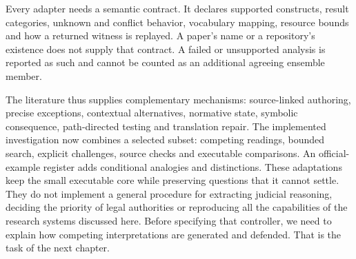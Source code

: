 
Every adapter needs a semantic contract. It declares supported constructs,
result categories, unknown and conflict behavior, vocabulary mapping,
resource bounds and how a returned witness is replayed. A paper's name or
a repository's existence does not supply that contract. A failed or
unsupported analysis is reported as such and cannot be counted as an
additional agreeing ensemble member.

The literature thus supplies complementary mechanisms: source-linked
authoring, precise exceptions, contextual alternatives, normative state,
symbolic consequence, path-directed testing and translation repair. The
implemented investigation now combines a selected subset: competing readings,
bounded search, explicit challenges, source checks and executable comparisons.
An official-example register adds conditional analogies and distinctions.
These adaptations keep the small executable core while preserving questions
that it cannot settle. They do not implement a general procedure for extracting
judicial reasoning, deciding the priority of legal authorities or reproducing
all the capabilities of the research systems discussed here. Before specifying that controller, we need to explain
how competing interpretations are generated and defended. That is the task
of the next chapter.
